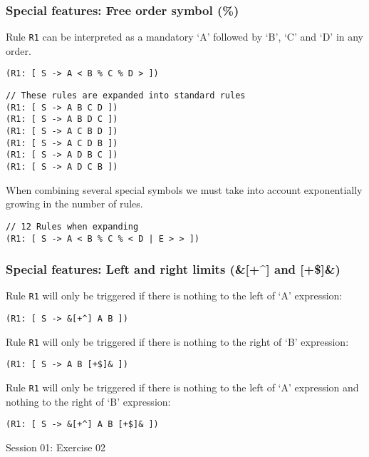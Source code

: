 \documentclass[11pt]{beamer}
\begin{document}
\begin{frame}[fragile]
\frametitle{Special features: Free order symbol (\%)}
\small
Rule \texttt{R1} can be interpreted as a mandatory `A' followed by `B', `C' and `D' in any order.
\begin{lstlisting}[language=lekta]
(R1: [ S -> A < B % C % D > ])
\end{lstlisting}
\pause
\begin{lstlisting}[language=lekta]
// These rules are expanded into standard rules
(R1: [ S -> A B C D ])
(R1: [ S -> A B D C ])
(R1: [ S -> A C B D ])
(R1: [ S -> A C D B ])
(R1: [ S -> A D B C ])
(R1: [ S -> A D C B ])
\end{lstlisting}
\vspace{10pt}
\pause
When combining several special symbols we must take into account exponentially growing in the number of rules.
\begin{lstlisting}[language=lekta]
// 12 Rules when expanding
(R1: [ S -> A < B % C % < D | E > > ])
\end{lstlisting}
\end{frame}

\begin{frame}[fragile]
\frametitle{Special features: Left and right limits (\&[+\^{}] and [+\$]\&)}
\small
Rule \texttt{R1} will only be triggered if there is nothing to the left of `A' expression:
\begin{lstlisting}[language=lekta]
(R1: [ S -> &[+^] A B ])
\end{lstlisting}
\pause
\vspace{15pt}
Rule \texttt{R1} will only be triggered if there is nothing to the right of `B' expression:
\begin{lstlisting}[language=lekta]
(R1: [ S -> A B [+$]& ])
\end{lstlisting}
\pause
\vspace{15pt}
Rule \texttt{R1} will only be triggered if there is nothing to the left of `A' expression and nothing to the right of `B' expression:
\begin{lstlisting}[language=lekta]
(R1: [ S -> &[+^] A B [+$]& ])
\end{lstlisting}
\end{frame}

\begin{frame}[fragile]
\Huge
\begin{center}
Session 01: Exercise 02
\end{center}
\end{frame}
\end{document}
